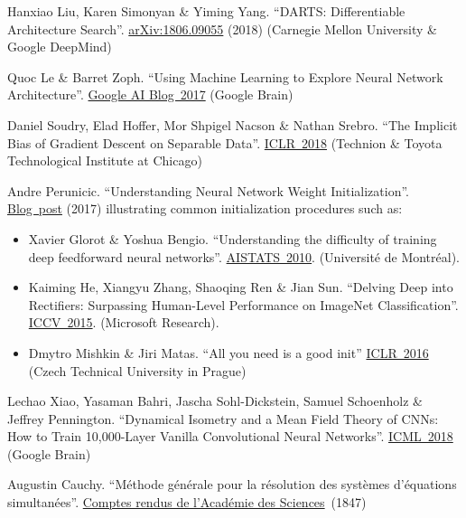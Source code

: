 \documentclass{article}
\begin{document}
\begin{thebibliography}{10}

 Hanxiao Liu, Karen Simonyan \& Yiming Yang. ``DARTS: Differentiable Architecture Search''. \href{https://arxiv.org/pdf/1806.09055.pdf}{arXiv:1806.09055} (2018) (Carnegie Mellon University \& Google DeepMind)

 Quoc Le \& Barret Zoph. ``Using Machine Learning to Explore Neural Network Architecture''. \href{https://ai.googleblog.com/2017/05/using-machine-learning-to-explore.html}{Google AI Blog~2017} (Google Brain)

 Daniel Soudry, Elad Hoffer, Mor Shpigel Nacson \& Nathan Srebro. ``The Implicit Bias of Gradient Descent on Separable Data''. \href{https://openreview.net/pdf?id=r1q7n9gAb}{ICLR~2018} (Technion \& Toyota Technological Institute at Chicago)

 Andre Perunicic. ``Understanding Neural Network Weight Initialization''. \href{https://intoli.com/blog/neural-network-initialization/}{Blog~post} (2017) illustrating common initialization procedures such as:
\begin{itemize}
\item Xavier Glorot \& Yoshua Bengio. ``Understanding the difficulty of training deep feedforward neural networks''. \href{http://proceedings.mlr.press/v9/glorot10a/glorot10a.pdf}{AISTATS~2010}. (Universit\'e de Montr\'eal).
\item Kaiming He, Xiangyu Zhang, Shaoqing Ren \& Jian Sun. ``Delving Deep into Rectifiers: Surpassing Human-Level Performance on ImageNet Classification''. \href{https://www.cv-foundation.org/openaccess/content_iccv_2015/papers/He_Delving_Deep_into_ICCV_2015_paper.pdf}{ICCV~2015}. (Microsoft Research).
\item Dmytro Mishkin \& Jiri Matas. ``All you need is a good init'' \href{https://arxiv.org/pdf/1511.06422.pdf}{ICLR~2016} (Czech Technical University in Prague)
\end{itemize}

 Lechao Xiao, Yasaman Bahri, Jascha Sohl-Dickstein, Samuel Schoenholz \& Jeffrey Pennington. ``Dynamical Isometry and a Mean Field Theory of CNNs: How to Train 10,000-Layer Vanilla Convolutional Neural Networks''. \href{https://arxiv.org/pdf/1806.05393.pdf}{ICML~2018} (Google Brain)

 Augustin Cauchy. ``M\'ethode g\'en\'erale pour la r\'esolution des syst\`emes d'\'equations simultan\'ees''. \href{https://gallica.bnf.fr/ark:/12148/bpt6k90190w/f406}{Comptes rendus de l'Acad\'emie des Sciences}~(1847)  


\end{thebibliography}
\end{document}
